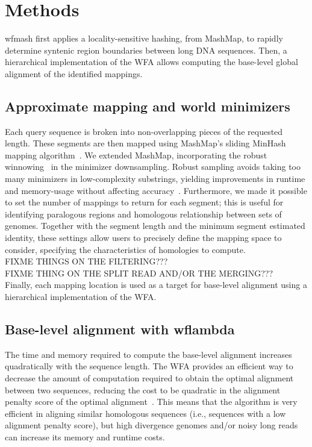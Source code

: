 \documentclass{bioinfo}
\theoremstyle{definition}
\begin{document}
\section{Methods}
\label{sec:methods}

wfmash first applies a locality-sensitive hashing, from MashMap, to rapidly determine syntenic region boundaries between long DNA sequences.
Then, a hierarchical implementation of the WFA allows computing the base-level global alignment of the identified mappings.

\subsection{Approximate mapping and world minimizers}
Each query sequence is broken into non-overlapping pieces of the requested length.
These segments are then mapped using MashMap's sliding MinHash mapping algorithm~\citep{Jain_2018}.
We extended MashMap, incorporating the robust winnowing~\citep{Schleimer2003} in the minimizer downsampling.
Robust sampling avoids taking too many minimizers in low-complexity substrings, yielding improvements in runtime and memory-usage without affecting accuracy~\citep{Jain_2020}.
Furthermore, we made it possible to set the number of mappings to return for each segment; this is useful for identifying paralogous regions and homologous relationship between sets of genomes.
Together with the segment length and the minimum segment estimated identity, these settings allow users to precisely define the mapping space to consider, specifying the characteristics of homologies to compute.
\\
FIXME THINGS ON THE FILTERING???
\\
FIXME THING ON THE SPLIT READ AND/OR THE MERGING???
\\

Finally, each mapping location is used as a target for base-level alignment using a hierarchical implementation
of the WFA.

\subsection{Base-level alignment with wflambda}
The time and memory required to compute the base-level alignment increases quadratically with the sequence length.
The WFA provides an efficient way to decrease the amount of computation required to obtain the optimal alignment between two sequences, reducing the cost to be quadratic in the alignment penalty score of the optimal alignment~\citep{Marco_Sola_2020}.
This means that the algorithm is very efficient in aligning similar homologous sequences (i.e., sequences with a low alignment penalty score), but high divergence genomes and/or noisy long reads can increase its memory and runtime costs.
\end{document}
